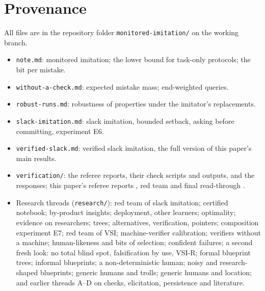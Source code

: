 \documentclass[11pt]{article}
\theoremstyle{definition}
\theoremstyle{remark}
\begin{document}
\section{Provenance}\label{app:provenance}
All files are in the repository folder \texttt{monitored-imitation/} on the working branch.
\begin{itemize}[nosep]
\item \cite{note1} \texttt{note.md}: monitored imitation; the lower bound for task-only protocols; the bit per mistake.
\item \cite{note2} \texttt{without-a-check.md}: expected mistake mass; end-weighted queries.
\item \texttt{robust-runs.md}: robustness of properties under the imitator's replacements.
\item \texttt{slack-imitation.md}: slack imitation, bounded setback, asking before committing, experiment E6.
\item \texttt{verified-slack.md}: verified slack imitation, the full version of this paper's main results.
\item \texttt{verification/}: the referee reports, their check scripts and outputs, and the responses; this paper's referee reports \cite{referee9,referee10}, red team \cite{redteam3} and final read-through \cite{readthrough}.
\item Research threads (\texttt{research/}): \cite{threadE} red team of slack imitation; \cite{threadF} certified notebook; \cite{threadG} by-product insights; \cite{threadH} deployment, other learners; \cite{threadJ} optimality; \cite{threadL} evidence on researchers; \cite{threadN} trees; \cite{threadQ} alternatives, verification, pointers; \cite{threadR} composition experiment E7; \cite{threadS} red team of VSI; \cite{threadT} machine-verifier calibration; \cite{threadU} verifiers without a machine; \cite{threadV} human-likeness and bits of selection; \cite{threadW} confident failures; \cite{threadQ2} a second fresh look: no total blind spot, falsification by use, VSI-R; \cite{threadY} formal blueprint trees; \cite{threadY2} informal blueprints; \cite{threadZ} a non-deterministic human; \cite{threadAA} noisy and research-shaped blueprints; \cite{threadGA} generic humans and trolls; \cite{threadGB} generic humans and location; and earlier threads A--D on checks, elicitation, persistence and literature.
\end{itemize}
\end{document}
